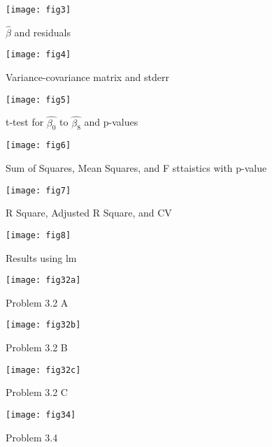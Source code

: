 \documentclass[letterpaper,11pt]{article}
\begin{document}
		
	\begin{figure}[h!]
	\centering
	\texttt{[image: fig3]}
	\caption{ $\hat{\beta}$ and residuals}
	\end{figure}

	\begin{figure}[h!]
	\centering
	\texttt{[image: fig4]}
	\caption{Variance-covariance matrix and stderr}
	\end{figure}
				
	\begin{figure}[h!]
	\centering
	\texttt{[image: fig5]}
	\caption{t-test for $\hat{\beta_{0}}$ to $\hat{\beta_{8}}$ and p-values}
	\end{figure}
					
	\begin{figure}[h!]
	\centering
	\texttt{[image: fig6]}
	\caption{Sum of Squares, Mean Squares, and F sttaistics with p-value}
	\end{figure}
						
	\begin{figure}[h!]
	\centering
	\texttt{[image: fig7]}
	\caption{R Square, Adjusted R Square, and CV}
	\end{figure}						

	\begin{figure}[h!]
	\centering
	\texttt{[image: fig8]}
	\caption{Results using lm}
	\end{figure}
				
	\begin{figure}[h!]
	\centering
	\texttt{[image: fig32a]}
	\caption{Problem 3.2 A}
	\end{figure}
			
	\begin{figure}[h!]
	\centering
	\texttt{[image: fig32b]}
	\caption{Problem 3.2 B}
	\end{figure}			
			
	\begin{figure}[h!]
	\centering
	\texttt{[image: fig32c]}
	\caption{Problem 3.2 C}
	\end{figure}
				
	\begin{figure}[h!]
	\centering
	\texttt{[image: fig34]}
	\caption{Problem 3.4}
	\end{figure}	
					
\end{document}
